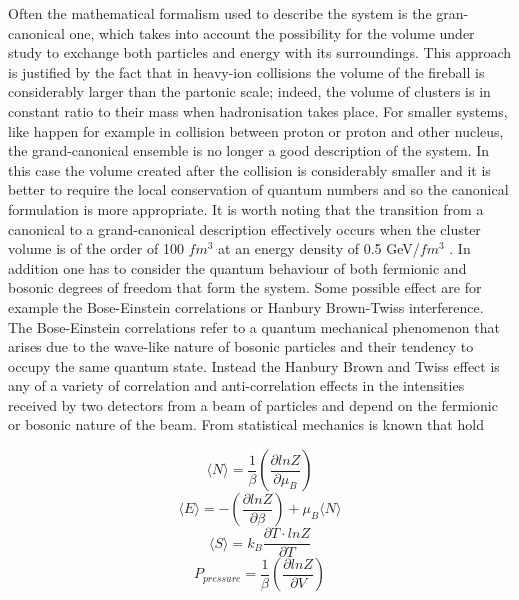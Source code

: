 \documentclass[12pt,a4paper]{book}
\begin{document}
	Often the mathematical formalism used to describe the system is the gran-canonical one, which takes into account the possibility for the volume under study to exchange both particles and energy with its surroundings. This approach is justified by the fact that in heavy-ion collisions the volume of the fireball is considerably larger than the partonic scale; indeed, the volume of clusters is in constant ratio to their mass when hadronisation takes place. For smaller systems, like happen for example in collision between proton or proton and other nucleus, the grand-canonical ensemble is no longer a good description of the system. In this case the volume created after the collision is considerably smaller and it is better to require the local conservation of quantum numbers and so the canonical formulation is more appropriate. It is worth noting that the transition from a canonical to a grand-canonical description effectively occurs when the cluster volume is of the order of 100 $fm^3$ at an energy density of 0.5 GeV/$fm^3$ \cite{PhysRevC.65.044901}. 
	In addition one has to consider the quantum behaviour of both fermionic and bosonic degrees of freedom that form the system. Some possible effect are for example the Bose-Einstein correlations or Hanbury Brown-Twiss interference. The Bose-Einstein correlations refer to a quantum mechanical phenomenon that arises due to the wave-like nature of bosonic particles and their tendency to occupy the same quantum state. Instead the Hanbury Brown and Twiss effect is any of a variety of correlation and anti-correlation effects in the intensities received by two detectors from a beam of particles and depend on the fermionic or bosonic nature of the beam. From statistical mechanics is known that hold
	
	\begin{equation}
		\langle N \rangle = \frac{1}{\beta} \left( \frac{\partial lnZ}{\partial \mu_B}\right)
		\label{eq:stat_n}
	\end{equation}
	\begin{equation}
		\langle E \rangle = - \left( \frac{\partial lnZ}{\partial \beta}\right) + \mu_B \langle N \rangle 
		\label{eq:stat_energy}
	\end{equation}
	\begin{equation}
		\langle S \rangle = k_B \frac{\partial T \cdot lnZ}{\partial T}
		\label{eq:stat_entropy}
	\end{equation}
	\begin{equation}
		P_{pressure} = \frac{1}{\beta} \left( \frac{\partial lnZ}{\partial V}\right) 
		\label{eq:stat_pressure}
	\end{equation}
	
\end{document}

